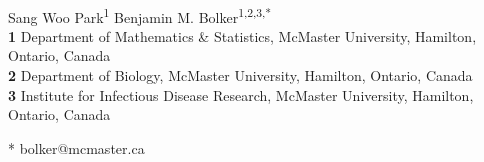 \documentclass[10pt,letterpaper]{article}
\date{}
\providecommand{\DIFaddbegin}{} %
\providecommand{\DIFaddend}{} %
\providecommand{\DIFdelbegin}{} %
\providecommand{\DIFdelend}{} %
\newcommand{\DIFscaledelfig}{0.5}
\newlength{\DIFdelgraphicswidth} %
\newlength{\DIFdelgraphicsheight} %
\newcommand{\DIFaddincludegraphics}[2][]{{\color{blue}\fbox{\DIFOincludegraphics[#1]{#2}}}} %
\newcommand{\DIFdelincludegraphics}[2][]{%
\sbox{\DIFdelgraphicsbox}{\DIFOincludegraphics[#1]{#2}}%
\settoboxwidth{\DIFdelgraphicswidth}{\DIFdelgraphicsbox} %
\settoboxtotalheight{\DIFdelgraphicsheight}{\DIFdelgraphicsbox} %
\scalebox{\DIFscaledelfig}{%
\parbox[b]{\DIFdelgraphicswidth}{\usebox{\DIFdelgraphicsbox}\\[-\baselineskip] \rule{\DIFdelgraphicswidth}{0em}}\llap{\resizebox{\DIFdelgraphicswidth}{\DIFdelgraphicsheight}{%
\setlength{\unitlength}{\DIFdelgraphicswidth}%
\begin{picture}(1,1)%
\thicklines\linethickness{2pt} %
{\color[rgb]{1,0,0}\put(0,0){\framebox(1,1){}}}%
{\color[rgb]{1,0,0}\put(0,0){\line( 1,1){1}}}%
{\color[rgb]{1,0,0}\put(0,1){\line(1,-1){1}}}%
\end{picture}%
}\hspace*{3pt}}} %
} %
\DeclareRobustCommand{\DIFaddbegin}{\DIFOaddbegin \let\includegraphics\DIFaddincludegraphics} %
\DeclareRobustCommand{\DIFaddend}{\DIFOaddend \let\includegraphics\DIFOincludegraphics} %
\DeclareRobustCommand{\DIFdelbegin}{\DIFOdelbegin \let\includegraphics\DIFdelincludegraphics} %
\DeclareRobustCommand{\DIFdelend}{\DIFOaddend \let\includegraphics\DIFOincludegraphics} %
\begin{document}
\vspace*{0.2in}

\begin{flushleft}
{\Large
\textbf\DIFdelbegin %
\DIFdelend \DIFaddbegin {} \DIFaddend %
}
\newline
\\
Sang Woo Park\textsuperscript{1}
Benjamin M. Bolker\textsuperscript{1,2,3,*}
\\
\bigskip
\textbf{1} Department of Mathematics \& Statistics,  McMaster University, Hamilton, Ontario, Canada
\\
\textbf{2} Department of Biology,  McMaster University, Hamilton, Ontario, Canada
\\
\textbf{3} Institute for Infectious Disease Research,  McMaster University, Hamilton, Ontario, Canada
\\
\bigskip

% 
%





* bolker@mcmaster.ca

\end{flushleft}
\end{document}
